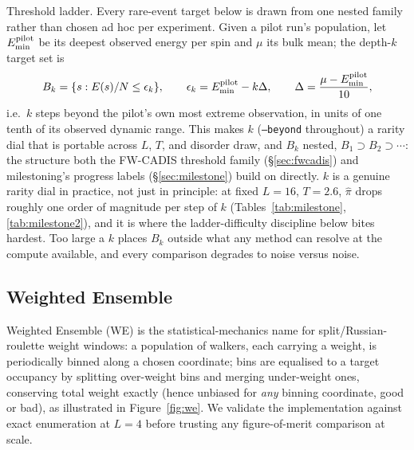 \documentclass[a4paper,fleqn]{cas-sc}
\begin{document}
Threshold ladder. Every rare-event target below is drawn from one nested family
rather than chosen ad hoc per experiment. Given a pilot run's population, let
$E^{\rm pilot}_{\min}$ be its deepest observed energy per spin and $\mu$ its bulk mean; the
depth-$k$ target set is
\begin{equation}
	B_k=\{s: E(s)/N\le\epsilon_k\},\qquad
	\epsilon_k=E^{\rm pilot}_{\min}-k\Delta,\qquad
	\Delta=\frac{\mu-E^{\rm pilot}_{\min}}{10},
	\label{eq:beyond}
\end{equation}
i.e.\ $k$ steps beyond the pilot's own most extreme observation, in units of one tenth of
its observed dynamic range. This makes $k$ (\texttt{--beyond} throughout) a rarity dial
that is portable across $L$, $T$, and disorder draw, and $B_k$ nested,
$B_1\supset B_2\supset\cdots$: the structure both the FW-CADIS threshold family
(\S\ref{sec:fwcadis}) and milestoning's progress labels (\S\ref{sec:milestone}) build on
directly. $k$ is a genuine rarity dial in practice, not just in principle: at fixed $L=16$,
$T=2.6$, $\hat\pi$ drops roughly one order of magnitude per step of $k$
(Tables~\ref{tab:milestone}, \ref{tab:milestone2}), and it is where the ladder-difficulty
discipline below bites hardest. Too large a $k$ places $B_k$ outside what any method can
resolve at the compute available, and every comparison degrades to noise versus noise.

\subsection{Weighted Ensemble}
Weighted Ensemble (WE) is the statistical-mechanics name for split/Russian-roulette weight
windows: a population of walkers, each carrying a weight, is periodically binned along a
chosen coordinate; bins are equalised to a target occupancy by splitting over-weight bins
and merging under-weight ones, conserving total weight exactly (hence unbiased for
\emph{any} binning coordinate, good or bad), as illustrated in
Figure~\ref{fig:we}. We validate the implementation against exact
enumeration at $L=4$ before trusting any figure-of-merit comparison at scale.
\end{document}
